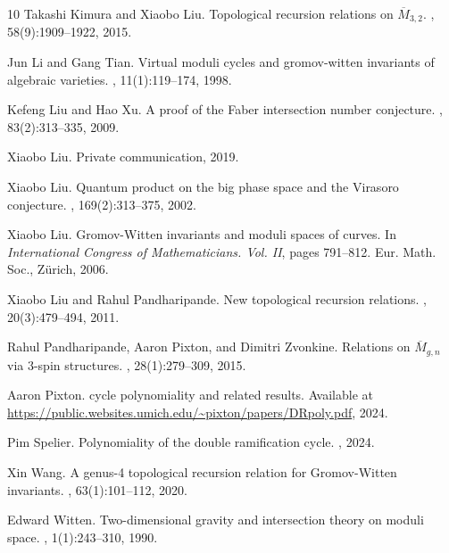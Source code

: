 \documentclass[12pt,reqno]{amsart}
\theoremstyle{plain}
\theoremstyle{definition}
\theoremstyle{remark}
\begin{document}
\begin{thebibliography}{10}
Takashi Kimura and Xiaobo Liu.
\newblock Topological recursion relations on $\overline{M}_{3,2}$.
, 58(9):1909--1922, 2015.

Jun Li and Gang Tian.
\newblock Virtual moduli cycles and gromov-witten invariants of algebraic
  varieties.
, 11(1):119--174,
  1998.

Kefeng Liu and Hao Xu.
\newblock A proof of the {F}aber intersection number conjecture.
, 83(2):313--335, 2009.

Xiaobo Liu.
\newblock Private communication, 2019.

Xiaobo Liu.
\newblock Quantum product on the big phase space and the {V}irasoro conjecture.
, 169(2):313--375, 2002.

Xiaobo Liu.
\newblock Gromov-{W}itten invariants and moduli spaces of curves.
\newblock In {\em International {C}ongress of {M}athematicians. {V}ol. {II}},
  pages 791--812. Eur. Math. Soc., Z\"{u}rich, 2006.

Xiaobo Liu and Rahul Pandharipande.
\newblock New topological recursion relations.
, 20(3):479--494, 2011.

Rahul Pandharipande, Aaron Pixton, and Dimitri Zvonkine.
\newblock Relations on $\overline{M}_{g,n}$ via 3-spin structures.
, 28(1):279--309,
  2015.

Aaron Pixton.
 cycle polynomiality and related results.
\newblock Available at \url{
  https://public.websites.umich.edu/~pixton/papers/DRpoly.pdf}, 2024.

Pim Spelier.
\newblock Polynomiality of the double ramification cycle.
, 2024.

Xin Wang.
\newblock A genus-4 topological recursion relation for {G}romov-{W}itten
  invariants.
, 63(1):101--112, 2020.

Edward Witten.
\newblock Two-dimensional gravity and intersection theory on moduli space.
, 1(1):243--310, 1990.

\end{thebibliography}

% 
% 
\end{document}
